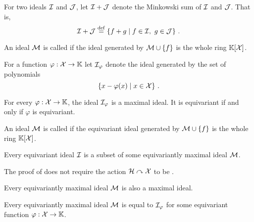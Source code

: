 %
\begin{definition}\label{def:ideal sum}
    For two ideals $\idl[I]$ and $\idl[J]$,
    let $\idl[I] + \idl[J]$ denote the Minkowski sum of $\idl[I]$ and $\idl[J]$.
    That is,
    \[
    \idl[I] + \idl[J] \defeq
    \setof{f + g}{f\in\idl[I],\ g\in\idl[J]} \ .
    \]
\end{definition}
%
\begin{definition}\label{def:maximal}
    An ideal $\idl[M]$ is called  if the ideal generated by $\idl[M]\cup\set{f}$ is the whole ring $\mathbb{K}[\mathcal{X}]$.
\end{definition}
%
\begin{definition}\label{def:equiv maximal}
    For a function $\varphi : \mathcal{X}\to\mathbb{K}$ let $\idl[I]_{\varphi}$ denote the ideal generated by the set of polynomials
    \[
    \setof{x - \varphi(x)}{x\in\Indets} \ .
    \]
\end{definition}
%
\begin{lemma}
    For every $\varphi : \mathcal{X} \to \mathbb{K}$,
    the ideal $\idl[I]_{\varphi}$ is a maximal ideal.
    It is equivariant if and only if $\varphi$ is equivariant.
\end{lemma}
%
\begin{definition}
    An ideal $\idl[M]$ is called  if the equivariant ideal generated by $\idl[M]\cup\set{f}$ is the whole ring $\mathbb{K}[\mathcal{X}]$.
\end{definition}
%
\begin{lemma}\label{lem:in equiv maximal}
    Every equivariant ideal $\idl[I]$ is a subset of some equivariantly maximal ideal $\idl[M]$.
\end{lemma}
%
\begin{remark}\label{rem:lem:in equiv max}
    The proof of  does not require the action $\mathcal{H}\curvearrowright\mathcal{X}$ to be .    
\end{remark}
%
\begin{lemma}\label{lem:equiv max is max}
    Every equivariantly maximal ideal $\idl[M]$ is also a maximal ideal.
\end{lemma}
%
\begin{corollary}
    Every equivariantly maximal ideal $\idl[M]$ is equal to $\idl[I]_{\varphi}$ for some equivariant function $\varphi : \mathcal{X}\to\mathbb{K}$.
\end{corollary}
%